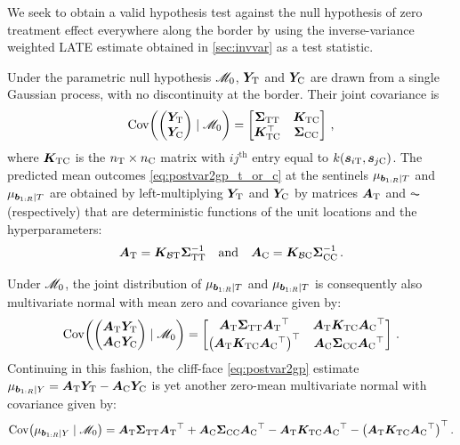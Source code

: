\documentclass[12pt]{article}
\begin{document}
\begin{appendices}
We seek to obtain a valid hypothesis test against the null hypothesis of zero treatment effect everywhere along the border by using the inverse-variance weighted LATE estimate obtained in \autoref{sec:invvar} as a test statistic.



Under the parametric null hypothesis \(\mathscr{M}_0\), \(\bm{Y}_{\mathrm{T}}{}\) and \(\bm{Y}_{\mathrm{C}}{}\) are drawn from a single Gaussian process, with no discontinuity at the border.
Their joint covariance is
\begin{equation}
\cov \del{\begin{pmatrix}\yt{} \\ \yc{}\end{pmatrix} \mid \modnull } 
    = \begin{bmatrix}
        \STT & \KTC \\
        \KTC \trans & \SCC
    \end{bmatrix}\,,
\end{equation}
where \(\bm{K}_{\mathrm{T} \mathrm{C}}\) is the \(n_{\mathrm{T}} \times n_{\mathrm{C}}\) matrix with \(ij^{\mathrm{th}}\) entry equal to \(k\del{\svec_{i\treat},\svec_{j\ctrol}}\).
The predicted mean outcomes \autoref{eq:postvar2gp_t_or_c} at the sentinels \(\mu_{\bm{b}_{1:R} \mid T}\) and \(\mu_{\bm{b}_{1:R} \mid T}\) are obtained by left-multiplying \(\bm{Y}_{\mathrm{T}}{}\) and \(\bm{Y}_{\mathrm{C}}{}\) by matrices \(\bm{A}_{\mathrm{T}}{}\) and \(\AC{}\) (respectively) that are deterministic functions of the unit locations and the hyperparameters:
\begin{equation}
    \bm{A}_{\mathrm{T}} = \bm{K}_{\mathcal{B} \mathrm{T}} \bm{\Sigma}_{\mathrm{T} \mathrm{T}}^{-1} \quad\text{and}\quad
    \bm{A}_{\mathrm{C}} = \bm{K}_{\mathcal{B} \mathrm{C}} \bm{\Sigma}_{\mathrm{C} \mathrm{C}}^{-1}\,.
\end{equation}

Under \(\mathscr{M}_0\), the joint distribution of \(\mu_{\bm{b}_{1:R} \mid T}\) and \(\mu_{\bm{b}_{1:R} \mid T}\) is consequently also multivariate normal with mean zero and covariance given by:
\begin{equation}
\cov \del{\begin{pmatrix}\AT{} \yt{} \\ \AC{} \yc{} \end{pmatrix} \mid \modnull } = \begin{bmatrix}
    \AT{} \STT \AT{}\trans & \AT{} \KTC \AC{}\trans \\
    \del{\AT{} \KTC \AC{} \trans}\trans & \AC{} \SCC \AC{}\trans
\end{bmatrix}\,.
\end{equation}
Continuing in this fashion, the cliff-face \autoref{eq:postvar2gp} estimate 
\(\mu_{\bm{b}_{1:R} \mid Y} = \bm{A}_{\mathrm{T}}{} \bm{Y}_{\mathrm{T}}{} - \bm{A}_{\mathrm{C}}{} \bm{Y}_{\mathrm{C}}{}\)
is yet another zero-mean multivariate normal with covariance given by:
\begin{equation}
        \cov \del{\mu_{\sentinels \mid Y} \mid \modnull} 
        = \AT{} \STT \AT{}\trans + \AC{} \SCC \AC{}\trans - \AT{} \KTC \AC{}\trans -  \del{\AT{}\KTC \AC{}\trans}\trans \,.
\end{equation}


\end{appendices}
\end{document}

